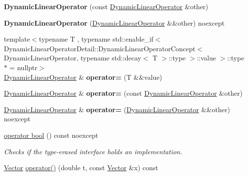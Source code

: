 \begin{DoxyCompactItemize}
\item 
{\bfseries Dynamic\+Linear\+Operator} (const \hyperlink{classSpacy_1_1DynamicLinearOperator}{Dynamic\+Linear\+Operator} \&other)\hypertarget{classSpacy_1_1DynamicLinearOperator_a390f4eea9c1e2e347349ea71409f3918}{}\label{classSpacy_1_1DynamicLinearOperator_a390f4eea9c1e2e347349ea71409f3918}

\item 
{\bfseries Dynamic\+Linear\+Operator} (\hyperlink{classSpacy_1_1DynamicLinearOperator}{Dynamic\+Linear\+Operator} \&\&other) noexcept\hypertarget{classSpacy_1_1DynamicLinearOperator_a874aa65b502112eeb49e6b1a53504a00}{}\label{classSpacy_1_1DynamicLinearOperator_a874aa65b502112eeb49e6b1a53504a00}

\item 
{\footnotesize template$<$typename T , typename std\+::enable\+\_\+if$<$ Dynamic\+Linear\+Operator\+Detail\+::\+Dynamic\+Linear\+Operator\+Concept$<$ Dynamic\+Linear\+Operator, typename std\+::decay$<$ T $>$\+::type $>$\+::value $>$\+::type $\ast$  = nullptr$>$ }\\\hyperlink{classSpacy_1_1DynamicLinearOperator}{Dynamic\+Linear\+Operator} \& {\bfseries operator=} (T \&\&value)\hypertarget{classSpacy_1_1DynamicLinearOperator_ab3bf64c6af574e7bbf76ce1565c978b4}{}\label{classSpacy_1_1DynamicLinearOperator_ab3bf64c6af574e7bbf76ce1565c978b4}

\item 
\hyperlink{classSpacy_1_1DynamicLinearOperator}{Dynamic\+Linear\+Operator} \& {\bfseries operator=} (const \hyperlink{classSpacy_1_1DynamicLinearOperator}{Dynamic\+Linear\+Operator} \&other)\hypertarget{classSpacy_1_1DynamicLinearOperator_a86fa1b52fd7806e186dd8e1808f89e00}{}\label{classSpacy_1_1DynamicLinearOperator_a86fa1b52fd7806e186dd8e1808f89e00}

\item 
\hyperlink{classSpacy_1_1DynamicLinearOperator}{Dynamic\+Linear\+Operator} \& {\bfseries operator=} (\hyperlink{classSpacy_1_1DynamicLinearOperator}{Dynamic\+Linear\+Operator} \&\&other) noexcept\hypertarget{classSpacy_1_1DynamicLinearOperator_a4afea1ce038547a12dbbbccd259a8890}{}\label{classSpacy_1_1DynamicLinearOperator_a4afea1ce038547a12dbbbccd259a8890}

\item 
\hyperlink{classSpacy_1_1DynamicLinearOperator_a8e59ff2dc6fa7f91c461c1af20bb81fb}{operator bool} () const noexcept
\begin{DoxyCompactList}\small\item\em Checks if the type-\/erased interface holds an implementation. \end{DoxyCompactList}\item 
\hyperlink{classSpacy_1_1Vector}{Vector} \hyperlink{classSpacy_1_1DynamicLinearOperator_a436759e2a2a59d57127e317d6b809349}{operator()} (double t, const \hyperlink{classSpacy_1_1Vector}{Vector} \&x) const \hypertarget{classSpacy_1_1DynamicLinearOperator_a436759e2a2a59d57127e317d6b809349}{}\label{classSpacy_1_1DynamicLinearOperator_a436759e2a2a59d57127e317d6b809349}


\end{DoxyCompactItemize}

